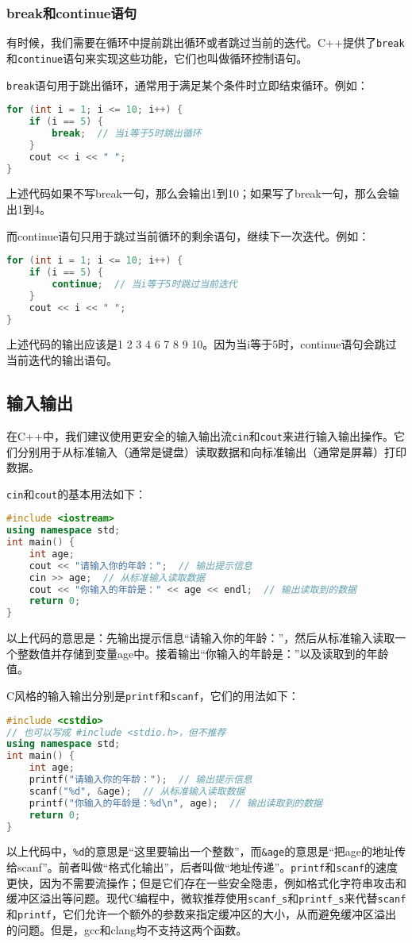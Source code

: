 \documentclass[../main.tex]{subfiles}
\begin{document}
\subsubsection{break和continue语句}

有时候，我们需要在循环中提前跳出循环或者跳过当前的迭代。C++提供了\texttt{break}和\texttt{continue}语句来实现这些功能，它们也叫做循环控制语句。

\texttt{break}语句用于跳出循环，通常用于满足某个条件时立即结束循环。例如：
\begin{lstlisting}[language=C++]
for (int i = 1; i <= 10; i++) {
    if (i == 5) {
        break;  // 当i等于5时跳出循环
    }
    cout << i << " ";
}
\end{lstlisting}
上述代码如果不写break一句，那么会输出1到10；如果写了break一句，那么会输出1到4。

而continue语句只用于跳过当前循环的剩余语句，继续下一次迭代。例如：
\begin{lstlisting}[language=C++]
for (int i = 1; i <= 10; i++) {
    if (i == 5) {
        continue;  // 当i等于5时跳过当前迭代
    }
    cout << i << " ";
}
\end{lstlisting}
上述代码的输出应该是1 2 3 4 6 7 8 9 10。因为当i等于5时，continue语句会跳过当前迭代的输出语句。

\subsection{输入输出}

在C++中，我们建议使用更安全的输入输出流\texttt{cin}和\texttt{cout}来进行输入输出操作。它们分别用于从标准输入（通常是键盘）读取数据和向标准输出（通常是屏幕）打印数据。

\texttt{cin}和\texttt{cout}的基本用法如下：
\begin{lstlisting}[language=C++]
#include <iostream>
using namespace std;
int main() {
    int age;
    cout << "请输入你的年龄：";  // 输出提示信息
    cin >> age;  // 从标准输入读取数据
    cout << "你输入的年龄是：" << age << endl;  // 输出读取到的数据
    return 0;
}
\end{lstlisting}
以上代码的意思是：先输出提示信息“请输入你的年龄：”，然后从标准输入读取一个整数值并存储到变量age中。接着输出“你输入的年龄是：”以及读取到的年龄值。

C风格的输入输出分别是\texttt{printf}和\texttt{scanf}，它们的用法如下：
\begin{lstlisting}[language=C++]
#include <cstdio>
// 也可以写成 #include <stdio.h>，但不推荐
using namespace std;
int main() {
    int age;
    printf("请输入你的年龄：");  // 输出提示信息
    scanf("%d", &age);  // 从标准输入读取数据
    printf("你输入的年龄是：%d\n", age);  // 输出读取到的数据
    return 0;
}
\end{lstlisting}
以上代码中，\texttt{\%d}的意思是“这里要输出一个整数”，而\texttt{\&age}的意思是“把age的地址传给scanf”。前者叫做“格式化输出”，后者叫做“地址传递”。\texttt{printf}和\texttt{scanf}的速度更快，因为不需要流操作；但是它们存在一些安全隐患，例如格式化字符串攻击和缓冲区溢出等问题。现代C编程中，微软推荐使用\texttt{scanf\_s}和\texttt{printf\_s}来代替\texttt{scanf}和\texttt{printf}，它们允许一个额外的参数来指定缓冲区的大小，从而避免缓冲区溢出的问题。但是，gcc和clang均不支持这两个函数。
\end{document}

